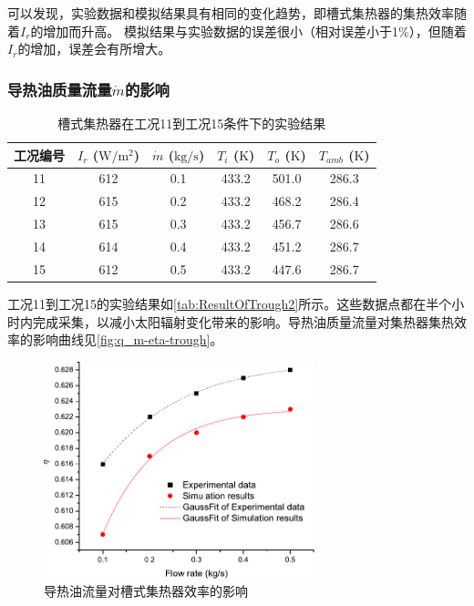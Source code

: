 可以发现，实验数据和模拟结果具有相同的变化趋势，即槽式集热器的集热效率随着$I_r$的增加而升高。
模拟结果与实验数据的误差很小（相对误差小于1\%），但随着$I_r$的增加，误差会有所增大。

\subsubsection{导热油质量流量$\dot{m}$的影响}

\begin{table}[htbp]
\setlength{\abovecaptionskip}{0pt}
	\caption{槽式集热器在工况11到工况15条件下的实验结果}
	\centering
	\begin{tabular}{cccccc}
		\toprule
		工况编号	& $I_r$ ($\mathrm{W/m^2}$)	&	$\dot{m}$ ($\mathrm{kg/s}$)			&	$T_i$ ($\mathrm{K}$)	&	$T_o$ ($\mathrm{K}$)		&	$T_{amb}$ ($\mathrm{K}$)\\
		\midrule
		11	&	612	&	0.1	&	433.2	&	501.0	&	286.3\\
		12	&	615	&	0.2	&	433.2	&	468.2	&	286.4\\
		13	&	615	&	0.3	&	433.2	&	456.7	&	286.6	\\
		14	&	614	&	0.4	&	433.2	&	451.2	&	286.7\\
		15	&	612	&	0.5	&	433.2	&	447.6	&	286.7\\
		\bottomrule
	\end{tabular}
	\label{tab:ResultOfTrough2}
\end{table}
工况11到工况15的实验结果如\autoref{tab:ResultOfTrough2}所示。这些数据点都在半个小时内完成采集，以减小太阳辐射变化带来的影响。导热油质量流量对集热器集热效率的影响曲线见\autoref{fig:q_m-eta-trough}。

\begin{figure}[!ht]
\centering
\includegraphics[width=0.7\textwidth]{fig/q_m-eta-trough}
\caption{导热油流量对槽式集热器效率的影响}
\label{fig:q_m-eta-trough}
\end{figure}

